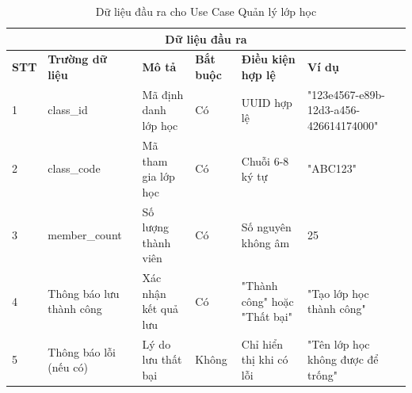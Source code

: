 \documentclass[../DoAn.tex]{subfiles}
\begin{document}
\vspace{0.5cm}

\begin{table}[h!]
\centering
\begin{tabular}{|m{1cm}|m{2.5cm}|m{3cm}|m{1cm}|m{2.5cm}|m{3.5cm}|}
    \hline
    \multicolumn{6}{|c|}{\textbf{Dữ liệu đầu ra}} \\
    \hline
    \textbf{STT} & \textbf{Trường dữ liệu} & \textbf{Mô tả} & \textbf{Bắt buộc} & \textbf{Điều kiện hợp lệ} & \textbf{Ví dụ} \\
    \hline
    1 & class\_id & Mã định danh lớp học & Có & UUID hợp lệ & "123e4567-e89b-12d3-a456-426614174000" \\
    \hline
    2 & class\_code & Mã tham gia lớp học & Có & Chuỗi 6-8 ký tự & "ABC123" \\
    \hline
    3 & member\_count & Số lượng thành viên & Có & Số nguyên không âm & 25 \\
    \hline
    4 & Thông báo lưu thành công & Xác nhận kết quả lưu & Có & "Thành công" hoặc "Thất bại" & "Tạo lớp học thành công" \\
    \hline
    5 & Thông báo lỗi (nếu có) & Lý do lưu thất bại & Không & Chỉ hiển thị khi có lỗi & "Tên lớp học không được để trống" \\
    \hline
\end{tabular}
\caption{Dữ liệu đầu ra cho Use Case Quản lý lớp học}
\end{table}

\vspace{1cm}

\end{document}
